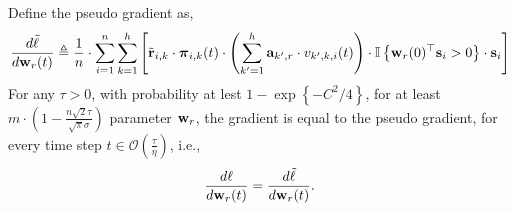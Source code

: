 \documentclass[10pt]{article}
\begin{document}
\begin{lem}
	Define the pseudo gradient as,
\begin{equation*}
	\frac{d \tilde{\ell}}{d {\mathbf{w}}_r(t)} \triangleq \frac{1}{n} \cdot \sum\limits_{i=1}^{n}{ \sum\limits_{k=1}^{h}{ \left[ {\tilde{\mathbf{r}}}_{i,k} \cdot {\boldsymbol{\pi}}_{i,k}(t) \cdot \left( \sum\limits_{k^\prime = 1}^{h}{ {\mathbf{a}}_{k^\prime,r}  \cdot v_{k^\prime,k,i}(t) } \right) \cdot {\mathbb{I}}\left\{ {\mathbf{w}}_r(0)^\top {\mathbf{s}}_i > 0 \right\} \cdot {\mathbf{s}}_i \right] } }
\end{equation*}
	For any $\tau > 0$, with probability at lest $1 - \exp\left\{ - C^2/4 \right\} $, for at least $m \cdot \left( 1 - \frac{n\sqrt{2}\tau}{\sqrt{\pi}\sigma} \right)$ parameter ${\mathbf{w}}_r$, the gradient is equal to the pseudo gradient, for every time step $t \in \mathcal{O}\left(\frac{\tau}{\eta}\right)$, i.e.,
\begin{equation}
	\frac{d\ell}{d {\mathbf{w}}_r(t)} = \frac{d \tilde{\ell}}{d {\mathbf{w}}_r(t)}.
\end{equation}
\end{lem}
\end{document}
